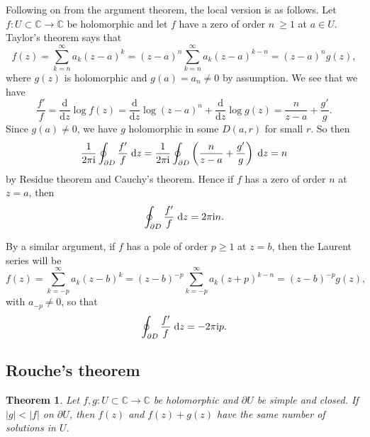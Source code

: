 \documentclass[letter-paper]{tufte-book}
\newtheorem{theorem}{\color{pastel-blue}Theorem}[section]
\newcommand{\zi}{{\rm i}}
\begin{document}
Following on from the argument theorem, the local version is as follows. Let $f:
U \subset \mathbb{C} \to \mathbb{C}$ be holomorphic and let $f$ have a zero of
order $n\ \geq 1$ at $a \in U$. Taylor's theorem says that
\begin{equation*}
  f(z) = \sum_{k=n}^\infty a_k (z-a)^k = (z-a)^n \sum_{k=n}^\infty a_k (z-a)^{k-n} = (z-a)^n g(z),
\end{equation*}
where $g(z)$ is holomorphic and $g(a) = a_n \neq 0$ by assumption. We see that
we have
\begin{equation*}
  \frac{f'}{f} = \frac{\mathrm{d}}{\mathrm{d}z}\log f(z) = \frac{\mathrm{d}}{\mathrm{d}z} \log (z-a)^n + \frac{\mathrm{d}}{\mathrm{d}z} \log g(z) = \frac{n}{z-a} + \frac{g'}{g}.
\end{equation*}
Since $g(a) \neq 0$, we have $g$ holomorphic in some $D(a, r)$ for small $r$. So
then
\begin{equation*}
  \frac{1}{2\pi\zi} \oint_{\partial D} \frac{f'}{f}\; \mathrm{d}z = \frac{1}{2\pi\zi} \oint_{\partial D} \left(\frac{n}{z-a} + \frac{g'}{g}\right)\; \mathrm{d}z = n
\end{equation*}
by Residue theorem and Cauchy's theorem. Hence if $f$ has a zero of order $n$ at
$z=a$, then
\begin{equation}
  \oint_{\partial D} \frac{f'}{f}\; \mathrm{d}z = 2\pi\zi n.
\end{equation}

By a similar argument, if $f$ has a pole of order $p \geq 1$ at $z=b$, then the
Laurent series will be
\begin{equation*}
  f(z) = \sum_{k=-p}^\infty a_k (z-b)^k = (z-b)^{-p} \sum_{k=-p}^\infty a_k (z+p)^{k-n} = (z-b)^{-p} g(z),
\end{equation*}
with $a_{-p} \neq 0$, so that
\begin{equation}
  \oint_{\partial D} \frac{f'}{f}\; \mathrm{d}z = -2\pi\zi p.
\end{equation}


\subsection{Rouche's theorem}

\begin{theorem}
  Let $f, g: U \subset \mathbb{C} \to \mathbb{C}$ be holomorphic and $\partial
  U$ be simple and closed. If $|g| < |f|$ on $\partial U$, then $f(z)$ and $f(z)
  + g(z)$ have the same number of solutions in $U$.
\end{theorem}
\end{document}

